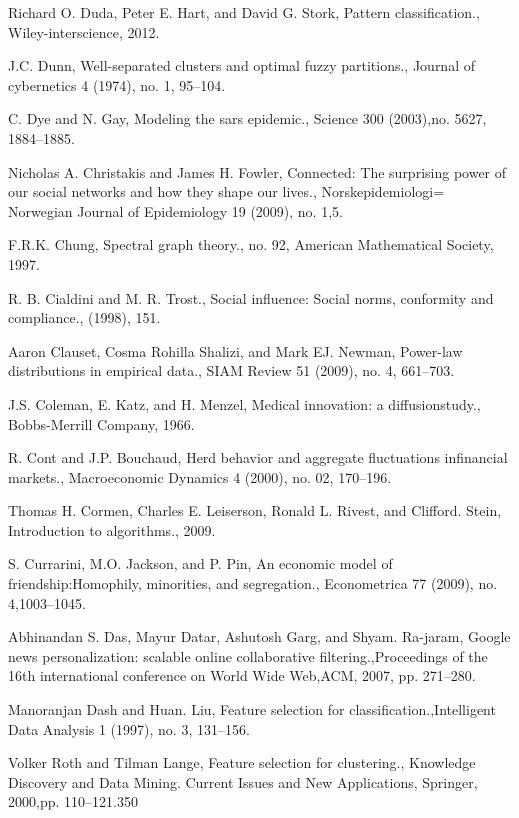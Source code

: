 \begin{thebibliography}{999}
 Richard O. Duda, Peter E. Hart, and David G. Stork, Pattern classification., Wiley-interscience, 2012.

 J.C. Dunn, Well-separated clusters and optimal fuzzy partitions., Journal of cybernetics 4 (1974), no. 1, 95–104.

 C. Dye and N. Gay, Modeling the sars epidemic., Science 300 (2003),no. 5627, 1884–1885.

 Nicholas A. Christakis and James H. Fowler, Connected: The surprising power of our social networks and how they shape our lives., Norskepidemiologi= Norwegian Journal of Epidemiology 19 (2009), no. 1,5.

 F.R.K. Chung, Spectral graph theory., no. 92, American Mathematical Society, 1997.

 R. B. Cialdini and M. R. Trost., Social influence: Social norms, conformity and compliance., (1998), 151.

 Aaron Clauset, Cosma Rohilla Shalizi, and Mark EJ. Newman, Power-law distributions in empirical data., SIAM Review 51 (2009), no. 4, 661–703.

 J.S. Coleman, E. Katz, and H. Menzel, Medical innovation: a diffusionstudy., Bobbs-Merrill Company, 1966.

 R. Cont and J.P. Bouchaud, Herd behavior and aggregate fluctuations infinancial markets., Macroeconomic Dynamics 4 (2000), no. 02, 170–196.

 Thomas H. Cormen, Charles E. Leiserson, Ronald L. Rivest, and Clifford. Stein, Introduction to algorithms., 2009.

 S. Currarini, M.O. Jackson, and P. Pin, An economic model of friendship:Homophily, minorities, and segregation., Econometrica 77 (2009), no. 4,1003–1045.

 Abhinandan S. Das, Mayur Datar, Ashutosh Garg, and Shyam. Ra-jaram, Google news personalization: scalable online collaborative filtering.,Proceedings of the 16th international conference on World Wide Web,ACM, 2007, pp. 271–280.

 Manoranjan Dash and Huan. Liu, Feature selection for classification.,Intelligent Data Analysis 1 (1997), no. 3, 131–156.

 Volker Roth and Tilman Lange, Feature selection for clustering., Knowledge Discovery and Data Mining. Current Issues and New Applications, Springer, 2000,pp. 110–121.350


\end{thebibliography}
